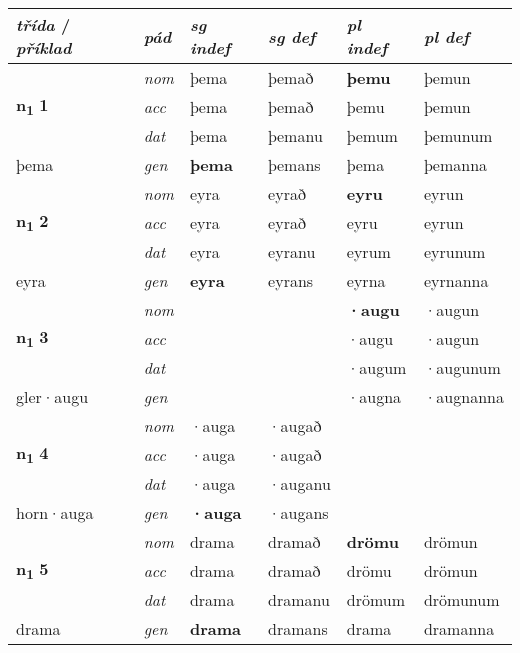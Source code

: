 
\begin{longtable}[l]{X>{\footnotesize\itshape}XXXXX}
{\textbf{\textit{třída}} / \textit{příklad}} & {\textit{pád}} & {\textit{sg indef}} & {\textit{sg def}} & {\textit{pl indef}} & {\textit{pl def}}\\ \cmidrule{1-6}
\endhead
\multirow{3}{*}{{{\textbf{n{\textsubscript{1}}} \Large{\textbf{1}}}}} & nom & þema & þemað & \textbf{þemu} & þemun \\*
 & acc & þema & þemað & þemu & þemun \\*
 & dat & þema & þemanu & þemum & þemunum \\*
 {\footnotesize{þema}} & gen & \textbf{þema} & þemans & þema & þemanna \\
\cmidrule{1-6}

\multirow{3}{*}{{{\textbf{n{\textsubscript{1}}} \Large{\textbf{2}}}}} & nom & eyra & eyrað & \textbf{eyru} & eyrun \\*
 & acc & eyra & eyrað & eyru & eyrun \\*
 & dat & eyra & eyranu & eyrum & eyrunum \\*
 {\footnotesize{eyra}} & gen & \textbf{eyra} & eyrans & eyrna & eyrnanna \\
\cmidrule{1-6}

\multirow{3}{*}{{{\textbf{n{\textsubscript{1}}} \Large{\textbf{3}}}}} & nom &  &  & \textbf{·augu} & ·augun \\*
 & acc &  &  & ·augu & ·augun \\*
 & dat &  &  & ·augum & ·augunum \\*
 {\footnotesize{gler\allowbreak ·augu}} & gen & \textbf{} &  & ·augna & ·augnanna \\
\cmidrule{1-6}

\multirow{3}{*}{{{\textbf{n{\textsubscript{1}}} \Large{\textbf{4}}}}} & nom & ·auga & ·augað & \textbf{} &  \\*
 & acc & ·auga & ·augað &  &  \\*
 & dat & ·auga & ·auganu &  &  \\*
 {\footnotesize{horn\allowbreak ·auga}} & gen & \textbf{·auga} & ·augans &  &  \\
\cmidrule{1-6}

\multirow{3}{*}{{{\textbf{n{\textsubscript{1}}} \Large{\textbf{5}}}}} & nom & drama & dramað & \textbf{drömu} & drömun \\*
 & acc & drama & dramað & drömu & drömun \\*
 & dat & drama & dramanu & drömum & drömunum \\*
 {\footnotesize{drama}} & gen & \textbf{drama} & dramans & drama & dramanna \\
\cmidrule{1-6}


\end{longtable}
